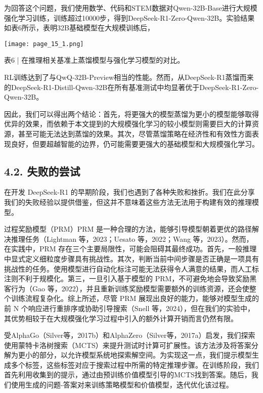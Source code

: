 \documentclass[12pt,a4paper]{report} %
\begin{document}
为回答这个问题，我们使用数学、代码和STEM数据对Qwen-32B-Base进行大规模强化学习训练，训练超过10000步，得到DeepSeek-R1-Zero-Qwen-32B。实验结果如表6所示，表明32B基础模型在大规模训练后，
\begin{center}
\texttt{[image: page\_15\_1.png]}
\end{center}
\begin{center}
表6 | 在推理相关基准上蒸馏模型与强化学习模型的对比。
\end{center}






RL训练达到了与QwQ-32B-Preview相当的性能。然而，从DeepSeek-R1蒸馏而来的DeepSeek-R1-Distill-Qwen-32B在所有基准测试中均显著优于DeepSeek-R1-Zero-Qwen-32B。


因此，我们可以得出两个结论：首先，将更强大的模型蒸馏为更小的模型能够取得优异的效果，而依赖于本文提到的大规模强化学习的较小模型则需要巨大的计算资源，甚至可能无法达到蒸馏的效果。其次，尽管蒸馏策略在经济性和有效性方面表现良好，但要超越智能的边界，仍可能需要更强大的基础模型和大规模强化学习。


\subsection*{4.2. 失败的尝试}


在开发 DeepSeek-R1 的早期阶段，我们也遇到了各种失败和挫折。我们在此分享我们的失败经验以提供借鉴，但这并不意味着这些方法无法用于构建有效的推理模型。


过程奖励模型（PRM）PRM 是一种合理的方法，能够引导模型朝着更优的路径解决推理任务（Lightman 等，2023；Uesato 等，2022；Wang 等，2023）。然而，在实践中，PRM 存在三个主要局限性，可能会阻碍其最终成功。首先，一般推理中显式定义细粒度步骤具有挑战性。其次，判断当前中间步骤是否正确是一项具有挑战性的任务。使用模型进行自动化标注可能无法获得令人满意的结果，而人工标注则不利于规模化。第三，一旦引入基于模型的 PRM，不可避免地会导致奖励黑客行为（Gao 等，2022），并且重新训练奖励模型需要额外的训练资源，还会使整个训练流程复杂化。综上所述，尽管 PRM 展现出良好的能力，能够对模型生成的前 N 个响应进行重排序或协助引导搜索（Snell 等，2024），但在我们的实验中，其优势相较于在大规模强化学习过程中引入的额外计算开销而言仍然有限。


受AlphaGo（Silver等，2017b）和AlphaZero（Silver等，2017a）启发，我们探索使用蒙特卡洛树搜索（MCTS）来提升测试时计算可扩展性。该方法涉及将答案分解为更小的部分，以允许模型系统地探索解空间。为实现这一点，我们提示模型生成多个标签，这些标签对应于搜索过程中所需的特定推理步骤。在训练阶段，我们首先利用收集到的提示，通过由预训练价值模型引导的MCTS找到答案。随后，我们使用生成的问题-答案对来训练策略模型和价值模型，迭代优化该过程。
\end{document}
